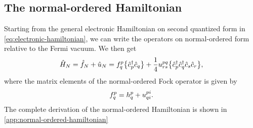         \subsection{The normal-ordered Hamiltonian}
            Starting from the general electronic Hamiltonian on second quantized
            form in \autoref{eq:electronic-hamiltonian}, we can write the
            operators on normal-ordered form relative to the Fermi vacuum.
            We then get
            \begin{align}
                \hat{H}_N
                = \hat{f}_N + \hat{u}_N
                = f^{p}_{q}\bigl\{ 
                    \hat{c}_{p}^{\dagger}
                    \hat{c}_{q}
                 \bigr\}
                + \frac{1}{4}u^{pq}_{rs}\bigl\{ 
                    \hat{c}_{p}^{\dagger}
                    \hat{c}_{q}^{\dagger}
                    \hat{c}_{s}
                    \hat{c}_{r}
                 \bigr\},
            \end{align}
            where the matrix elements of the normal-ordered Fock operator is
            given by
            \begin{align}
                f^{p}_{q}
                = h^{p}_{q}
                + u^{pi}_{qi}.
            \end{align}
            The complete derivation of the normal-ordered Hamiltonian is shown
            in \autoref{app:normal-ordered-hamiltonian}


